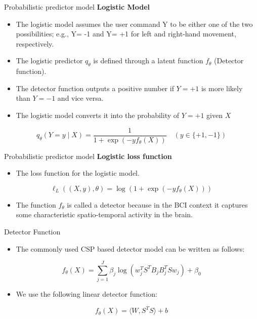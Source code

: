 \documentclass[11pt]{beamer}
\begin{document}
\begin{frame}{Probabilistic predictor model}
\textbf{Logistic Model}
 \begin{itemize}
\item The logistic model assumes the user command Y to be either one of the two possibilities; e.g., Y= -1 and Y= +1 for left and right-hand movement, respectively. 
\item The logistic predictor $q_\theta $ is defined through a latent function $f_\theta $ (Detector function).
\item The detector function outputs a positive number if $Y= +1$ is more likely than $Y= -1$ and vice versa.
\item The logistic model converts it into the probability of $Y= +1$ given $X$
    \end{itemize}
    
\[    q_\theta\left(Y=y\mid X\right)=\frac{1}{1+\exp{\left(-y f_\theta\left(X\right)\right)}}\quad \left(y\in\lbrace +1,-1 \rbrace\right) \]
\end{frame}
\begin{frame}{Probabilistic predictor model}
\textbf{Logistic loss function}
 \begin{itemize}
 \item The loss function for the logistic model.
 \end{itemize}
 \[\ell_L\left(\left(X,y\right),\theta\right)=\log\left(1+\exp{\left(-y f_\theta\left(X\right)\right)}\right) \]
 \begin{itemize}
 \item The function $f_\theta$  is called a detector because in the BCI context it captures some characteristic spatio-temporal activity in the brain.

 \end{itemize}
 \end{frame}
\begin{frame}{Detector Function}

 \begin{itemize}
 \item The commonly used CSP based detector model can be written as follows:
 \end{itemize}
 \[f_\theta\left(X\right)=\sum_{j=1}^J \beta_j\log\left(w_j^T S^T B_j B_j^T S w_j\right)+\beta_0 \]
 \begin{itemize}
 \item We use the following linear detector function:
 \end{itemize}
 \[  f_\theta\left(X\right)=\langle W,S^T S\rangle+b  \]
 \end{frame}
\end{document}
